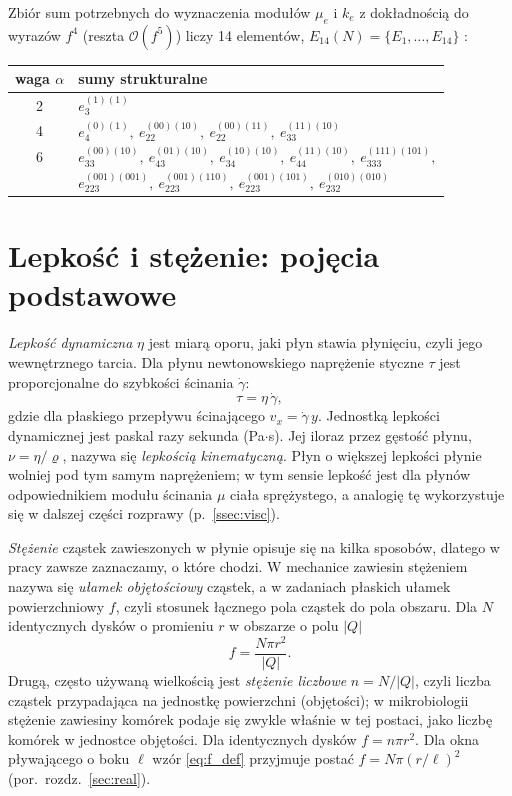 \documentclass[12pt,a4paper,twoside,openright]{report}
\theoremstyle{definition}
\theoremstyle{remark}
\begin{document}
Zbiór sum potrzebnych do wyznaczenia modułów $\mu_e$ i $k_e$ z dokładnością do wyrazów $f^4$ (reszta $\mathcal O(f^5)$) liczy 14 elementów, $E_{14}(N)=\{E_1,\dots,E_{14}\}$ \cite{mityushev2025computationalpart3}:

\begin{center}
\small
\begin{tabular}{@{}c>{\raggedright\arraybackslash}p{}@{}}
\toprule
waga $\alpha$ & sumy strukturalne \\ \midrule
2 & $e_3^{(1)(1)}$ \\
4 & $e_4^{(0)(1)},\ e_{22}^{(00)(10)},\ e_{22}^{(00)(11)},\ e_{33}^{(11)(10)}$ \\
6 & $e_{33}^{(00)(10)},\ e_{43}^{(01)(10)},\ e_{34}^{(10)(10)},\ e_{44}^{(11)(10)},\ e_{333}^{(111)(101)},$\\
 & $e_{223}^{(001)(001)},\ e_{223}^{(001)(110)},\ e_{223}^{(001)(101)},\ e_{232}^{(010)(010)}$ \\ \bottomrule
\end{tabular}
\end{center}

\section{Lepkość i stężenie: pojęcia podstawowe}\label{ssec:visc_conc}

\emph{Lepkość dynamiczna} $\eta$ jest miarą oporu, jaki płyn stawia płynięciu, czyli jego wewnętrznego tarcia. Dla płynu newtonowskiego naprężenie styczne $\tau$ jest proporcjonalne do szybkości ścinania $\dot\gamma$:
\begin{equation}\label{eq:newton}
\tau=\eta\,\dot\gamma ,
\end{equation}
gdzie dla płaskiego przepływu ścinającego $v_x=\dot\gamma\,y$. Jednostką lepkości dynamicznej jest paskal razy sekunda (Pa$\cdot$s). Jej iloraz przez gęstość płynu, $\nu=\eta/\varrho$, nazywa się \emph{lepkością kinematyczną}. Płyn o większej lepkości płynie wolniej pod tym samym naprężeniem; w tym sensie lepkość jest dla płynów odpowiednikiem modułu ścinania $\mu$ ciała sprężystego, a analogię tę wykorzystuje się w dalszej części rozprawy (p.~\ref{ssec:visc}).

\emph{Stężenie} cząstek zawieszonych w płynie opisuje się na kilka sposobów, dlatego w pracy zawsze zaznaczamy, o które chodzi. W mechanice zawiesin stężeniem nazywa się \emph{ułamek objętościowy} cząstek, a w zadaniach płaskich ułamek powierzchniowy $f$, czyli stosunek łącznego pola cząstek do pola obszaru. Dla $N$ identycznych dysków o promieniu $r$ w obszarze o polu $|Q|$
\begin{equation}\label{eq:f_def}
f=\frac{N\pi r^2}{|Q|}.
\end{equation}
Drugą, często używaną wielkością jest \emph{stężenie liczbowe} $n=N/|Q|$, czyli liczba cząstek przypadająca na jednostkę powierzchni (objętości); w mikrobiologii stężenie zawiesiny komórek podaje się zwykle właśnie w tej postaci, jako liczbę komórek w jednostce objętości. Dla identycznych dysków $f=n\pi r^2$. Dla okna pływającego o boku $\ell$ wzór \eqref{eq:f_def} przyjmuje postać $f=N\pi(r/\ell)^2$ (por.\ rozdz.~\ref{sec:real}).
\end{document}
